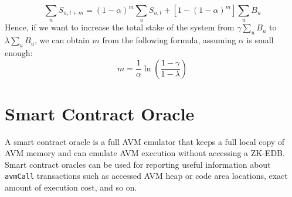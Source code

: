 \documentclass[11pt, A4]{report}
\begin{document}
    \[
        \sum_{u}S_{u,t+m} = (1 - \alpha)^{m}\sum_{u}S_{u,t} + [1 - (1 - \alpha)^{m}]\sum_{u}B_u
    \]
    Hence, if we want to increase the total stake of the system from \(\gamma \sum_{u}B_u\) to \(\lambda \sum_{u}B_u\),
    we can obtain \(m\) from the following formula, assuming \(\alpha\) is small enough:
    \[
        m = \frac{1}{\alpha} \ln \left(\frac{1 - \gamma}{1 - \lambda}\right)
    \]


    \section{Smart Contract Oracle}\label{sec:smart-contract-oracle}

    A smart contract oracle is a full AVM emulator that keeps a full local copy of AVM memory and can emulate AVM
    execution without accessing a ZK-EDB. Smart contract oracles can be used for reporting useful information about
    \texttt{avmCall} transactions such as accessed AVM heap or code area locations, exact amount of execution cost,
    and so on.
\end{document}
